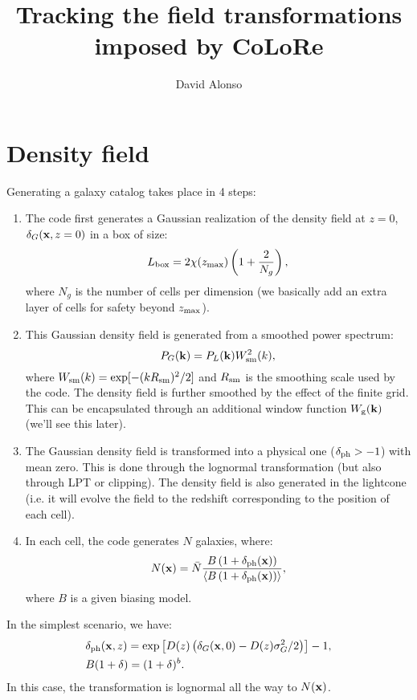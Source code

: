 \documentclass[a4paper,10pt]{article}
\title{Tracking the field transformations imposed by CoLoRe}
\author{David Alonso}
\begin{document}
\maketitle

\section{Density field}
Generating a galaxy catalog takes place in 4 steps:
\begin{enumerate}
  \item The code first generates a Gaussian realization of the density field at $z=0$, $\delta_G({\bf x},z=0)$ in a box of size:
    \begin{equation}
      L_{\rm box}=2\chi(z_{\rm max})\left(1+\frac{2}{N_g}\right),
    \end{equation}
    where $N_g$ is the number of cells per dimension (we basically add an extra layer of cells for safety beyond $z_{\rm max}$).
  \item This Gaussian density field is generated from a smoothed power spectrum:
    \begin{equation}
      P_G({\bf k})=P_L({\bf k})W^2_{\rm sm}(k),
    \end{equation}
    where $W_{\rm sm}(k)=\exp[-(kR_{\rm sm})^2/2]$ and $R_{\rm sm}$ is the smoothing scale used by the code. The density field is further smoothed by the effect of the finite grid. This can be encapsulated through an additional window function $W_{\rm g}({\bf k})$ (we'll see this later).
  \item The Gaussian density field is transformed into a physical one ($\delta_{\rm ph}>-1$) with mean zero. This is done through the lognormal transformation (but also through LPT or clipping). The density field is also generated in the lightcone (i.e. it will evolve the field to the redshift corresponding to the position of each cell).
  \item In each cell, the code generates $N$ galaxies, where:
    \begin{equation}
      N({\bf x})=\bar{N}\frac{B\left(1+\delta_{\rm ph}({\bf x})\right)}{\left\langle B\left(1+\delta_{\rm ph}({\bf x})\right)\right\rangle},
    \end{equation}
    where $B$ is a given biasing model.
\end{enumerate}
In the simplest scenario, we have:
\begin{align}
  &\delta_{\rm ph}({\bf x},z)=\exp\left[D(z)\left(\delta_G({\bf x},0)-D(z)\sigma_G^2/2\right)\right]-1,\\
  &B(1+\delta)=(1+\delta)^b.
\end{align}
In this case, the transformation is lognormal all the way to $N({\bf x})$.
\end{document}
